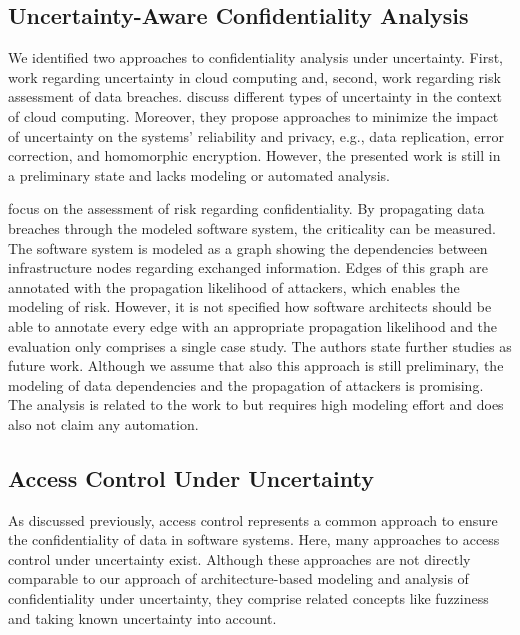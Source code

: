 \subsection{Uncertainty-Aware Confidentiality Analysis}

We identified two approaches to confidentiality analysis under uncertainty.
First, work regarding uncertainty in cloud computing and, second, work regarding risk assessment of data breaches.
\textcite{tchernykh_towards_2019} discuss different types of uncertainty in the context of cloud computing.
Moreover, they propose approaches to minimize the impact of uncertainty on the systems' reliability and privacy, e.g., data replication, error correction, and homomorphic encryption.
However, the presented work is still in a preliminary state and lacks modeling or automated analysis.

\textcite{morali_it_2008} focus on the assessment of risk regarding confidentiality.
By propagating data breaches through the modeled software system, the criticality can be measured.
The software system is modeled as a graph showing the dependencies between infrastructure nodes regarding exchanged information.
Edges of this graph are annotated with the propagation likelihood of attackers, which enables the modeling of risk.
However, it is not specified how software architects should be able to annotate every edge with an appropriate propagation likelihood and the evaluation only comprises a single case study.
The authors state further studies as future work.
Although we assume that also this approach is still preliminary, the modeling of data dependencies and the propagation of attackers is promising.
The analysis is related to the work to \textcite{walter_architecture-based_2023-1} but requires high modeling effort and does also not claim any automation.


\subsection{Access Control Under Uncertainty}

As discussed previously, access control represents a common approach to ensure the confidentiality of data in software systems.
Here, many approaches to access control under uncertainty exist.
Although these approaches are not directly comparable to our approach of architecture-based modeling and analysis of confidentiality under uncertainty, they comprise related concepts like fuzziness and taking known uncertainty into account.  

